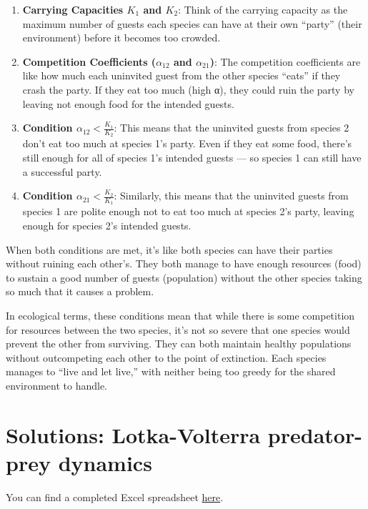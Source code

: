 \documentclass[
  a4paper]{book}
\begin{document}
\begin{enumerate}
\def\labelenumi{\arabic{enumi}.}
\item
  \textbf{Carrying Capacities \(K_1\) and \(K_2\)}: Think of the carrying capacity as the maximum number of guests each species can have at their own ``party'' (their environment) before it becomes too crowded.
\item
  \textbf{Competition Coefficients (\(\alpha_{12}\) and \(\alpha_{21}\))}: The competition coefficients are like how much each uninvited guest from the other species ``eats'' if they crash the party. If they eat too much (high α), they could ruin the party by leaving not enough food for the intended guests.
\item
  \textbf{Condition \(\alpha_{12} < \frac{K_1}{K_2}\)}: This means that the uninvited guests from species 2 don't eat too much at species 1's party. Even if they eat some food, there's still enough for all of species 1's intended guests --- so species 1 can still have a successful party.
\item
  \textbf{Condition \(\alpha_{21} < \frac{K_2}{K_1}\)}: Similarly, this means that the uninvited guests from species 1 are polite enough not to eat too much at species 2's party, leaving enough for species 2's intended guests.
\end{enumerate}

When both conditions are met, it's like both species can have their parties without ruining each other's. They both manage to have enough resources (food) to sustain a good number of guests (population) without the other species taking so much that it causes a problem.

In ecological terms, these conditions mean that while there is some competition for resources between the two species, it's not so severe that one species would prevent the other from surviving. They can both maintain healthy populations without outcompeting each other to the point of extinction. Each species manages to ``live and let live,'' with neither being too greedy for the shared environment to handle.

\hypertarget{solutions-lotka-volterra-predator-prey-dynamics}{%
\section{Solutions: Lotka-Volterra predator-prey dynamics}\label{solutions-lotka-volterra-predator-prey-dynamics}}

You can find a completed Excel spreadsheet \href{https://www.dropbox.com/s/wet7brtgxywdqi5/10.\%20Pred-PreyDynamics.xlsx?dl=1}{here}.
\end{document}

